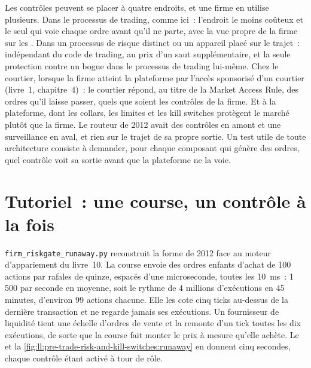 Les contrôles peuvent se placer à quatre endroits, et une firme en utilise plusieurs. Dans le processus de trading, comme ici~: l'endroit le moins coûteux et le seul
qui voie chaque ordre avant qu'il ne parte, avec la vue propre de la firme sur les . Dans un processus de risque distinct ou un appareil
placé sur le trajet~: indépendant du code de trading, au prix d'un saut supplémentaire, et la seule protection contre un bogue dans
le processus de trading lui-même. Chez le courtier, lorsque la firme atteint la plateforme par l'accès sponsorisé d'un courtier
(livre~1, chapitre~4)~: le courtier répond, au titre de la Market Access Rule, des ordres qu'il laisse passer, quels que soient les
contrôles de la firme. Et à la plateforme, dont les collars, les limites et les kill switches protègent le marché plutôt que la firme. Le routeur de 2012
avait des contrôles en amont et une surveillance en aval, et rien sur le trajet de sa propre sortie. Un test utile de toute architecture consiste à
demander, pour chaque composant qui génère des ordres, quel contrôle voit sa sortie avant que la plateforme ne la voie.

\section{Tutoriel~: une course, un contrôle à la fois}\label{tut:ll:pre-trade-risk-and-kill-switches:tut}

\texttt{firm\_riskgate\_runaway.py} reconstruit la forme de 2012 face au moteur d'appariement du livre~10. La course envoie des ordres enfants d'achat
de 100 actions par rafales de quinze, espacés d'une microseconde, toutes les \qty{10}{\milli\second}~: 1\,500 par seconde en moyenne, soit le rythme de
4 millions d'exécutions en 45 minutes, d'environ 99 actions chacune. Elle les cote cinq ticks au-dessus de la dernière transaction et ne regarde jamais
ses exécutions. Un fournisseur de liquidité tient une échelle d'ordres de vente et la remonte d'un tick toutes les dix exécutions, de sorte que la course fait monter
le prix à mesure qu'elle achète. Le  et
la \cref{fig:ll:pre-trade-risk-and-kill-switches:runaway} en donnent cinq secondes, chaque contrôle étant activé à tour de rôle.

